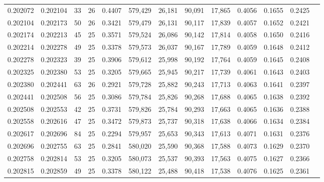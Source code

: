 \begin{tabular}{rrrrrrrrrrrrr}
0.202072 & 0.202104 &  33 &  26 &                                     0.4407 & 579,429 &  26,181 &  90,091 &  17,865 & 0.4056 & 0.1655 & 0.2425 \\
0.202104 & 0.202173 &  50 &  26 &                                     0.3421 & 579,479 &  26,131 &  90,117 &  17,839 & 0.4057 & 0.1652 & 0.2421 \\
0.202174 & 0.202213 &  45 &  25 &                                     0.3571 & 579,524 &  26,086 &  90,142 &  17,814 & 0.4058 & 0.1650 & 0.2416 \\
0.202214 & 0.202278 &  49 &  25 &                                     0.3378 & 579,573 &  26,037 &  90,167 &  17,789 & 0.4059 & 0.1648 & 0.2412 \\
0.202278 & 0.202323 &  39 &  25 &                                     0.3906 & 579,612 &  25,998 &  90,192 &  17,764 & 0.4059 & 0.1645 & 0.2408 \\
0.202325 & 0.202380 &  53 &  25 &                                     0.3205 & 579,665 &  25,945 &  90,217 &  17,739 & 0.4061 & 0.1643 & 0.2403 \\
0.202380 & 0.202441 &  63 &  26 &                                     0.2921 & 579,728 &  25,882 &  90,243 &  17,713 & 0.4063 & 0.1641 & 0.2397 \\
0.202441 & 0.202508 &  56 &  25 &                                     0.3086 & 579,784 &  25,826 &  90,268 &  17,688 & 0.4065 & 0.1638 & 0.2392 \\
0.202508 & 0.202553 &  42 &  25 &                                     0.3731 & 579,826 &  25,784 &  90,293 &  17,663 & 0.4065 & 0.1636 & 0.2388 \\
0.202558 & 0.202616 &  47 &  25 &                                     0.3472 & 579,873 &  25,737 &  90,318 &  17,638 & 0.4066 & 0.1634 & 0.2384 \\
0.202617 & 0.202696 &  84 &  25 &                                     0.2294 & 579,957 &  25,653 &  90,343 &  17,613 & 0.4071 & 0.1631 & 0.2376 \\
0.202696 & 0.202755 &  63 &  25 &                                     0.2841 & 580,020 &  25,590 &  90,368 &  17,588 & 0.4073 & 0.1629 & 0.2370 \\
0.202758 & 0.202814 &  53 &  25 &                                     0.3205 & 580,073 &  25,537 &  90,393 &  17,563 & 0.4075 & 0.1627 & 0.2366 \\
0.202815 & 0.202859 &  49 &  25 &                                     0.3378 & 580,122 &  25,488 &  90,418 &  17,538 & 0.4076 & 0.1625 & 0.2361 \\

\end{tabular}

